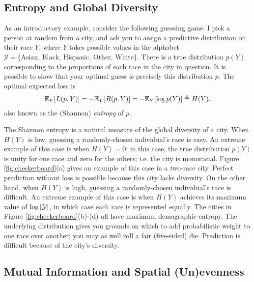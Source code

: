 \documentclass[english]{scrartcl}
\begin{document}
	\subsection{Entropy and Global Diversity}

		As an introductory example, consider the following guessing game: I pick a person at random from a city, and ask you to assign a predictive distribution on their race $Y$, where $Y$ takes possible values in the alphabet  $\mathcal{Y} = \{\text{Asian, Black, Hispanic, Other, White}\}$. There is a true distribution $p(Y)$ corresponding to the proportions of each race in the city in question. It is possible to show that your optimal guess is precisely this distribution $p$. The optimal expected loss is 
		\begin{equation}
			\mathbb{E}_Y[L(p,Y)] = -\mathbb{E}_Y[R(p,Y)] = -\mathbb{E}_Y[\log p(Y)] \triangleq H(Y), 
		\end{equation}
		also known as the (Shannon) \emph{entropy} of $p$. 

		The Shannon entropy is a natural measure of the global diversity of a city. When $H(Y)$ is low, guessing a randomly-chosen individual's race is easy. An extreme example of this case is when $H(Y) = 0$; in this case, the true distribution $p(Y)$ is unity for one race and zero for the others; i.e. the city is monoracial. Figure \ref{fig:checkerboard}(a) gives an example of this case in a two-race city. Perfect prediction without loss is possible because this city lacks diversity. On the other hand, when $H(Y)$ is high, guessing a randomly-chosen individual's race is difficult. An extreme example of this case is when $H(Y)$ achieves its maximum value of $\log \left|\mathcal{Y}\right|$, in which case each race is represented equally. The cities in Figure \ref{fig:checkerboard}(b)-(d) all have maximum demographic entropy. The underlying distribution gives you grounds on which to add probabilistic weight to one race over another; you may as well roll a fair (five-sided) die. Prediction is difficult because of the city's diversity. 

	\subsection{Mutual Information and Spatial (Un)evenness}
\end{document}
